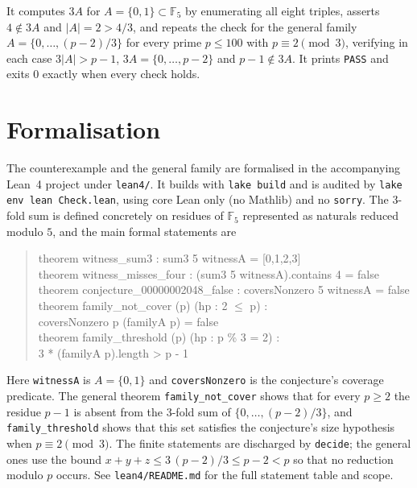 \documentclass[11pt]{article}
\theoremstyle{definition}
\theoremstyle{remark}
\newcommand{\F}{\mathbb{F}}
\begin{document}
It computes $3A$ for $A = \{0,1\} \subset \F_5$ by enumerating all eight
triples, asserts $4 \notin 3A$ and $|A| = 2 > 4/3$, and repeats the check for
the general family $A = \{0,\dots,(p-2)/3\}$ for every prime $p \le 100$ with
$p \equiv 2 \pmod 3$, verifying in each case $3|A| > p-1$, $3A =
\{0,\dots,p-2\}$ and $p - 1 \notin 3A$. It prints \texttt{PASS} and exits $0$
exactly when every check holds.

\section{Formalisation}

The counterexample and the general family are formalised in the accompanying
Lean~4 project under \texttt{lean4/}. It builds with \texttt{lake build} and is
audited by \texttt{lake env lean Check.lean}, using core Lean only (no Mathlib)
and no \texttt{sorry}. The 3-fold sum is defined concretely on residues of
$\F_5$ represented as naturals reduced modulo $5$, and the main formal
statements are

\begin{quote}\ttfamily
theorem witness\_sum3 : sum3 5 witnessA = [0,1,2,3]\\
theorem witness\_misses\_four : (sum3 5 witnessA).contains 4 = false\\
theorem conjecture\_00000002048\_false : coversNonzero 5 witnessA = false\\
theorem family\_not\_cover (p) (hp : 2 \(\le\) p) :\\
\hspace*{2em}coversNonzero p (familyA p) = false\\
theorem family\_threshold (p) (hp : p \% 3 = 2) :\\
\hspace*{2em}3 * (familyA p).length > p - 1
\end{quote}

\noindent Here \texttt{witnessA} is $A = \{0,1\}$ and \texttt{coversNonzero}
is the conjecture's coverage predicate. The general theorem
\texttt{family\_not\_cover} shows that for every $p \ge 2$ the residue $p-1$ is
absent from the 3-fold sum of $\{0,\dots,(p-2)/3\}$, and \texttt{family\_threshold}
shows that this set satisfies the conjecture's size hypothesis when $p \equiv 2
\pmod 3$. The finite statements are discharged by \texttt{decide}; the general
ones use the bound $x+y+z \le 3\,(p-2)/3 \le p-2 < p$ so that no reduction
modulo $p$ occurs. See \texttt{lean4/README.md} for the full statement table and
scope.
\end{document}
